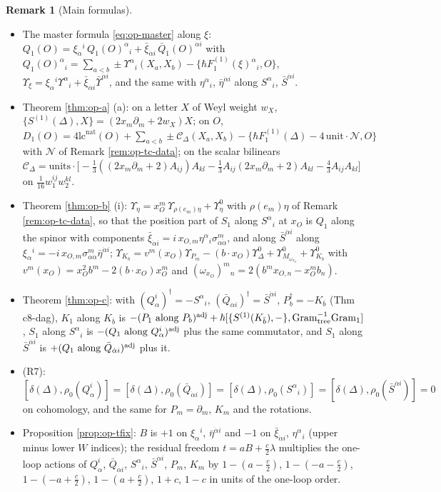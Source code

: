 \documentclass[11pt]{article}
\numberwithin{equation}{section}
\theoremstyle{plain}
\theoremstyle{definition}
\newtheorem{remark}[theorem]{Remark}
\newcommand{\lcn}{\mathrm{lc}^{\mathrm{nat}}}
\newcommand{\Fc}{\mathcal N}
\newcommand{\Comp}{\mathcal C}
\begin{document}
\begin{remark}[Main formulas]
\label{rem:op-tc-main}
\begin{itemize}
\item The master formula \eqref{eq:op-master} along $\xi$: $Q_1(O)=\xi_\alpha{}^i\,Q_1(O)^\alpha{}_i+\bar\xi_{\dot\alpha i}\,\bar Q_1(O)^{\dot\alpha i}$ with $Q_1(O)^\alpha{}_i=\sum_{a<b}\pm\Upsilon^\alpha{}_i(X_a,X_b)-\{\hbar F_1^{(1)}(\xi)^\alpha{}_i,O\}$, $\Upsilon_\xi=\xi_\alpha{}^i\Upsilon^\alpha{}_i+\bar\xi_{\dot\alpha i}\bar\Upsilon^{\dot\alpha i}$, and the same with $\eta^\alpha{}_i$, $\bar\eta^{\dot\alpha i}$ along $S^\alpha{}_i$, $\bar S^{\dot\alpha i}$.
\item Theorem \ref{thm:op-a} (a): on a letter $X$ of Weyl weight $w_X$, $\{S^{(1)}(\Delta),X\}=(2x_m\partial_m+2w_X)X$; on $O$, $D_1(O)=4\lcn(O)+\sum_{a<b}\pm\Comp_\Delta(X_a,X_b)-\{\hbar F_1^{(1)}(\Delta)-4\,\mathrm{unit}\cdot\Fc,O\}$ with $\Fc$ of Remark \ref{rem:op-tc-data}; on the scalar bilinears $\Comp_\Delta=\mathrm{units}\cdot\big[-\tfrac13((2x_m\partial_m+2)A_{ij})A_{kl}-\tfrac13A_{ij}(2x_m\partial_m+2)A_{kl}-\tfrac43A_{ij}A_{kl}\big]$ on $\tfrac1{16}w_1^{ij}w_2^{kl}$.
\item Theorem \ref{thm:op-b} (i): $\Upsilon_\eta=x_O^m\,\Upsilon_{\rho(e_m)\eta}+\Upsilon^0_\eta$ with $\rho(e_m)\eta$ of Remark \ref{rem:op-tc-data}, so that the position part of $S_1$ along $S^\alpha{}_i$ at $x_O$ is $Q_1$ along the spinor with components $\bar\xi_{\dot\alpha i}=i\,x_{O,m}\eta^\alpha{}_i\sigma^m_{\alpha\dot\alpha}$, and along $\bar S^{\dot\alpha i}$ along $\xi_\alpha{}^i=-i\,x_{O,m}\sigma^m_{\alpha\dot\alpha}\bar\eta^{\dot\alpha i}$; $\Upsilon_{K_b}=v^m(x_O)\Upsilon_{P_m}-(b\cdot x_O)\Upsilon^0_\Delta+\Upsilon^0_{M_{\omega_{x_O}}}+\Upsilon^0_{K_b}$ with $v^m(x_O)=x_O^2b^m-2(b\cdot x_O)x_O^m$ and $(\omega_{x_O})^m{}_n=2(b^mx_{O,n}-x_O^mb_n)$.
\item Theorem \ref{thm:op-c}: with $(Q^i_\alpha)^\dagger=-S^\alpha{}_i$, $(\bar Q_{\dot\alpha i})^\dagger=\bar S^{\dot\alpha i}$, $P_b^\dagger=-K_{\bar b}$ (Thm c8-dag), $K_1$ along $K_{\bar b}$ is $-(P_1\text{ along }P_b)^{\rm adj}+\hbar[\{S^{(1)}(K_{\bar b}),-\},\mathrm{Gram}_{\rm tree}^{-1}\mathrm{Gram}_1]$, $S_1$ along $S^\alpha{}_i$ is $-(Q_1\text{ along }Q^i_\alpha)^{\rm adj}$ plus the same commutator, and $S_1$ along $\bar S^{\dot\alpha i}$ is $+(Q_1\text{ along }\bar Q_{\dot\alpha i})^{\rm adj}$ plus it.
\item (R7): $[\delta(\Delta),\rho_0(Q^i_\alpha)]=[\delta(\Delta),\rho_0(\bar Q_{\dot\alpha i})]=[\delta(\Delta),\rho_0(S^\alpha{}_i)]=[\delta(\Delta),\rho_0(\bar S^{\dot\alpha i})]=0$ on cohomology, and the same for $P_m=\partial_m$, $K_m$ and the rotations.
\item Proposition \ref{prop:op-tfix}: $B$ is $+1$ on $\xi_\alpha{}^i$, $\bar\eta^{\dot\alpha i}$ and $-1$ on $\bar\xi_{\dot\alpha i}$, $\eta^\alpha{}_i$ (upper minus lower $W$ indices); the residual freedom $t=aB+\tfrac c2\lambda$ multiplies the one-loop actions of $Q^i_\alpha$, $\bar Q_{\dot\alpha i}$, $S^\alpha{}_i$, $\bar S^{\dot\alpha i}$, $P_m$, $K_m$ by $1-(a-\tfrac c2)$, $1-(-a-\tfrac c2)$, $1-(-a+\tfrac c2)$, $1-(a+\tfrac c2)$, $1+c$, $1-c$ in units of the one-loop order.
\end{itemize}
\end{remark}
\end{document}
